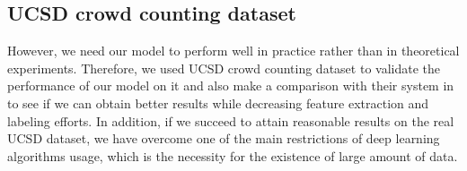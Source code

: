 \subsection{UCSD crowd counting dataset}

However, we need our model to perform well in practice rather than in theoretical experiments. Therefore, we used UCSD crowd counting dataset \cite{chan2008privacy} to validate the performance of our model on it and also make a comparison with their system in \cite{chan2008privacy} to see if we can obtain better results while decreasing feature extraction and labeling efforts. In addition, if we succeed to attain reasonable results on the real UCSD dataset, we have overcome one of the main restrictions of deep learning algorithms usage, which is the necessity for the existence of large amount of data.     


%
%
